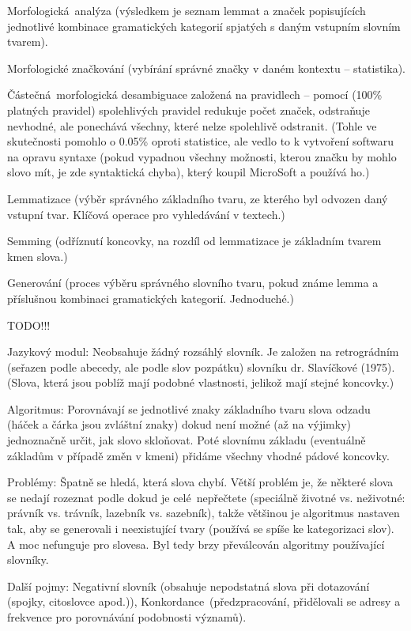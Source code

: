 \documentclass[12pt]{article}					%
\begin{document}
\begin{poznamka}
	Morfologická analýza (výsledkem je seznam lemmat a značek popisujících jednotlivé kombinace gramatických kategorií spjatých s daným vstupním slovním tvarem).

	Morfologické značkování (vybírání správné značky v daném kontextu – statistika).

	Částečná morfologická desambiguace založená na pravidlech – pomocí (100\% platných pravidel) spolehlivých pravidel redukuje počet značek, odstraňuje nevhodné, ale ponechává všechny, které nelze spolehlivě odstranit. (Tohle ve skutečnosti pomohlo o 0.05\% oproti statistice, ale vedlo to k vytvoření softwaru na opravu syntaxe (pokud vypadnou všechny možnosti, kterou značku by mohlo slovo mít, je zde syntaktická chyba), který koupil MicroSoft a používá ho.)

	Lemmatizace (výběr správného základního tvaru, ze kterého byl odvozen daný vstupní tvar. Klíčová operace pro vyhledávání v textech.)

	Semming (odříznutí koncovky, na rozdíl od lemmatizace je základním tvarem kmen slova.)

	Generování (proces výběru správného slovního tvaru, pokud známe lemma a příslušnou kombinaci gramatických kategorií. Jednoduché.)
\end{poznamka}


TODO!!!


\begin{definice}
	Jazykový modul: Neobsahuje žádný rozsáhlý slovník. Je založen na retrográdním (seřazen podle abecedy, ale podle slov pozpátku) slovníku dr. Slavíčkové (1975). (Slova, která jsou poblíž mají podobné vlastnosti, jelikož mají stejné koncovky.)

	Algoritmus: Porovnávají se jednotlivé znaky základního tvaru slova odzadu (háček a čárka jsou zvláštní znaky) dokud není možné (až na výjimky) jednoznačně určit, jak slovo skloňovat. Poté slovnímu základu (eventuálně základům v případě změn v kmeni) přidáme všechny vhodné pádové koncovky.

	Problémy: Špatně se hledá, která slova chybí. Větší problém je, že některé slova se nedají rozeznat podle dokud je celé nepřečtete (speciálně životné vs. neživotné: právník vs. trávník, lazebník vs. sazebník), takže většinou je algoritmus nastaven tak, aby se generovali i neexistující tvary (používá se spíše ke kategorizaci slov). A moc nefunguje pro slovesa. Byl tedy brzy převálcován algoritmy používající slovníky.

	Další pojmy: Negativní slovník (obsahuje nepodstatná slova při dotazování (spojky, citoslovce apod.)), Konkordance (předzpracování, přidělovali se adresy a frekvence pro porovnávání podobnosti významů).
\end{definice}
\end{document}
